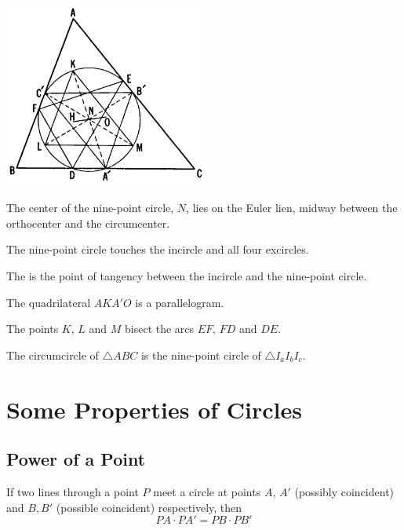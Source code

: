 \documentclass[DIV=12, a4]{scrartcl}
\begin{document}
 \begin{center}
		\includegraphics[width=0.5\textwidth]{media/1-8B}
\end{center}

\begin{theorem}
	The center of the nine-point circle, $N$, lies on the Euler lien, midway between the orthocenter and the circumcenter.
\end{theorem}

\begin{theorem}
	The nine-point circle touches the incircle and all four excircles.
\end{theorem}

The  is the point of tangency between the incircle and the nine-point circle.

\begin{lemma}
	The quadrilateral $AKA'O$ is a parallelogram.
\end{lemma}

\begin{lemma}
	The points $K$, $L$ and $M$ bisect the arcs $EF$, $FD$ and $DE$.
\end{lemma}

\begin{lemma}
	The circumcircle of $\triangle ABC$ is the nine-point circle of $\triangle I_a I_b I_c$.
\end{lemma}

\section{Some Properties of Circles}

\subsection{Power of a Point}

\begin{theorem}
	If two lines through a point $P$ meet a circle at points $A$, $A'$ (possibly coincident) and $B, B'$ (possible coincident) respectively, then
	$$
	PA \cdot PA' = PB \cdot PB'
	$$
\end{theorem}
\end{document}

